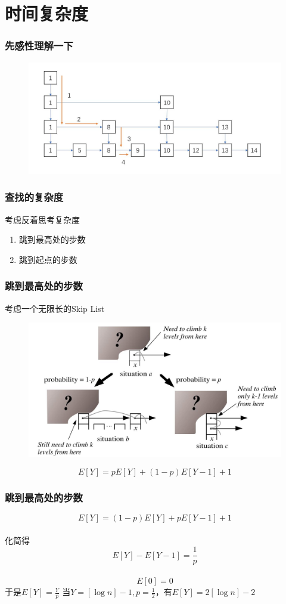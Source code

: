 \documentclass{beamer}
\begin{document}
	\section{时间复杂度}
	\begin{frame}
		\frametitle{先感性理解一下}
		\begin{figure}[H]
			\includegraphics[scale=0.25]{./img/fasterter.jpg}
		\end{figure}
	\end{frame}
	\begin{frame}
		\frametitle{查找的复杂度}
		考虑反着思考复杂度
		\begin{enumerate}
			\item 跳到最高处的步数
			\item 跳到起点的步数
		\end{enumerate}
	\end{frame}
	\begin{frame}
		\frametitle{跳到最高处的步数}
		考虑一个无限长的Skip List
		\begin{figure}[H]
			\centering
			\includegraphics[scale=0.2]{img/complexity.jpg}
		\end{figure}
		\pause
		$$E[Y] = pE[Y]+(1-p)E[Y-1]+1$$
	\end{frame}
	\begin{frame}
		\frametitle{跳到最高处的步数}
		$$E[Y] = (1-p)E[Y]+pE[Y-1]+1$$
		\pause
		\\化简得\\
		$$E[Y] - E[Y-1] = \frac{1}{p}$$\\
		\pause
		$$E[0] = 0$$
		\pause
		于是$E[Y] = \frac{Y}{p}$
		\pause
		当$Y = [\log{n}]-1, p=\frac{1}{2}$，有$E[Y] = 2[\log{n}]-2$
	\end{frame}
\end{document}
